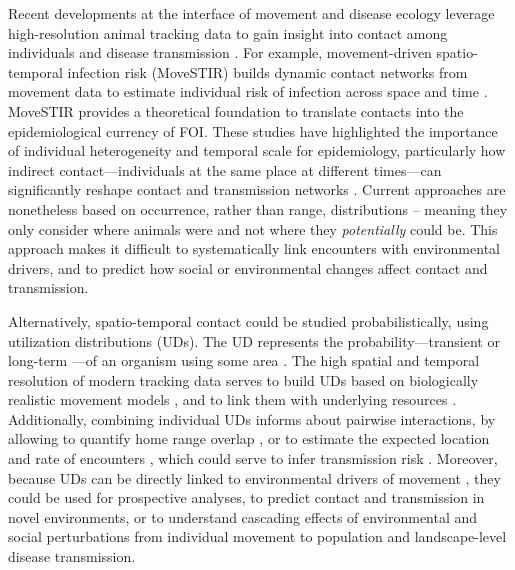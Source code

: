 ﻿\documentclass[11pt]{article}
\begin{document}
Recent developments at the interface of movement and disease ecology leverage high-resolution animal tracking data to gain insight into contact among individuals and disease transmission \citep{Richardson2015,Wilber2022,Yang2023}. For example, movement-driven spatio-temporal infection risk (MoveSTIR) builds dynamic contact networks from movement data to estimate individual risk of infection across space and time \citep{Wilber2022}. MoveSTIR provides a theoretical foundation to translate contacts into the epidemiological currency of FOI. These studies have highlighted the importance of individual heterogeneity and temporal scale for epidemiology, particularly how indirect contact---individuals at the same place at different times---can significantly reshape contact and transmission networks \citep{Richardson2015,Yang2023}. Current approaches are nonetheless based on occurrence, rather than range, distributions \citep[in the terminology of ][]{Alston2022} -- meaning they only consider where animals were and not where they \emph{potentially} could be. This approach makes it difficult to systematically link encounters with environmental drivers, and to predict how social or environmental changes affect contact and transmission. 

Alternatively, spatio-temporal contact could be studied probabilistically, using utilization distributions (UDs). The UD represents the probability---transient or long-term \citep{Tao2016}---of an organism using some area \citep{Worton1989}. The high spatial and temporal resolution of modern tracking data serves to build UDs based on biologically realistic movement models \citep{Kranstauber2012,Fleming2014}, and to link them with underlying resources \citep{Potts2023}.
Additionally, combining individual UDs informs about pairwise interactions, by allowing to quantify home range overlap \citep{Winner2018}, or to estimate the expected location and rate of encounters \citep{Noonan2021}, which could serve to infer transmission risk \citep{Godfrey2010, Godfrey2013,Noonan2021}. 
Moreover, because UDs can be directly linked to environmental drivers of movement \citep{Signer2017}, they could be used for prospective analyses, to predict contact and transmission in novel environments, or to understand cascading effects of environmental and social perturbations from individual movement to population and landscape-level disease transmission. 
\end{document}
